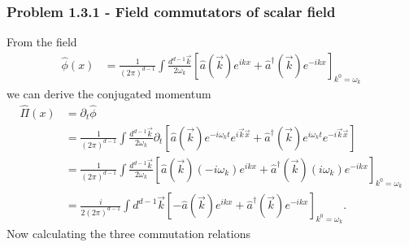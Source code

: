 \documentclass[10pt,a4paper]{article}
\theoremstyle{definition}
\begin{document}
\subsubsection{Problem 1.3.1 - Field commutators of scalar field}
From the field  
\begin{align}
    \hat\phi(x)&=\frac{1}{(2\pi)^{d-1}}\int \frac{d^{d-1}\vec{k}}{2\omega_k}\left[\hat a(\vec{k})e^{ikx} + \hat a^\dagger(\vec{k})e^{-ikx}\right]_{k^0=\omega_k}
\end{align}
we can derive the conjugated momentum
\begin{align}
    \hat\Pi(x)&=\partial_t\hat\phi\\
    &=\frac{1}{(2\pi)^{d-1}}\int \frac{d^{d-1}\vec{k}}{2\omega_k}\partial_t\left[\hat a(\vec{k})e^{-i\omega_kt}e^{i\vec{k}\vec{x}} + \hat a^\dagger(\vec{k})e^{i\omega_kt}e^{-i\vec{k}\vec{x}}\right]\\
    &=\frac{1}{(2\pi)^{d-1}}\int \frac{d^{d-1}\vec{k}}{2\omega_k}\left[\hat a(\vec{k})(-i\omega_k)e^{ikx} + \hat a^\dagger(\vec{k})(i\omega_k)e^{-ikx}\right]_{k^0=\omega_k}\\
    &=\frac{i}{2(2\pi)^{d-1}}\int d^{d-1}\vec{k}\left[-\hat a(\vec{k})e^{ikx} + \hat a^\dagger(\vec{k})e^{-ikx}\right]_{k^0=\omega_k}.
\end{align}
Now calculating the three commutation relations
\end{document}
